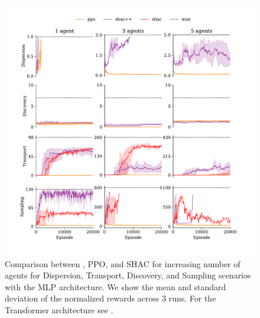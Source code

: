 \newpage
\appendix
\onecolumn

\begin{figure}[t]
    \centering
    \includegraphics[width=\columnwidth]{figs/main-mlp.pdf}
    \caption{Comparison between \fname{}, PPO, and SHAC for increasing number of agents for Dispersion, Transport, Discovery, and Sampling scenarios with the MLP architecture.
    We show the mean and standard deviation of the normalized rewards across $3$ runs. For the Transformer architecture see .
    }
    \label{apx:fig:experiments-mlp}
\end{figure}


